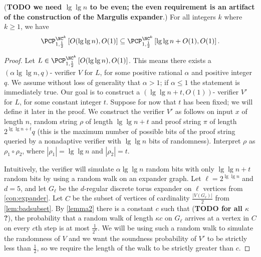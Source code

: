\documentclass[]{article}
\newcommand{\PCPcs}[5]{\PCP^{#1}_{#2, #3}\left[#4, #5\right]}
\begin{document}
\begin{lemma}[{\cite[Lemma~4]{fs96}}]\label{lem:derandomize}
  (\textbf{TODO we need $\lg \lg n$ to be even; the even requirement is an artifact of the construction of the Margulis expander}.)
  For all integers $k$ where $k \geq 1$, we have
  \begin{equation*}
    \PCPcs{\NC^k}{1}{\frac{1}{2}}{O(\lg \lg n)}{O(1)}
    \subseteq
    \PCPcs{\NC^k}{1}{\frac{1}{2}}{\lg \lg n + O(1)}{O(1)}.
  \end{equation*}
\end{lemma}
\begin{proof}
  Let $L \in \PCPcs{\NC^k}{1}{\frac{1}{2}}{O(\lg \lg n)}{O(1)}$.
  This means there exists a $(\alpha \lg \lg n, q)$-\PCP{} verifier $V$ for $L$, for some positive rational $\alpha$ and positive integer $q$.
  We assume without loss of generality that $\alpha > 1$; if $\alpha \leq 1$ the statement is immediately true.
  Our goal is to construct a $(\lg \lg n + t, O(1))$-\PCP{} verifier $V'$ for $L$, for some constant integer $t$.
  Suppose for now that $t$ has been fixed; we will define it later in the proof.
  We construct the verifier $V'$ as follows on input $x$ of length $n$, random string $\rho$ of length $\lg \lg n + t$ and proof string $\pi$ of length $2^{\lg \lg n + t} q$ (this is the maximum number of possible bits of the proof string queried by a nonadaptive verifier with $\lg \lg n$ bits of randomness).
  Interpret $\rho$ as $\rho_1 \circ \rho_2$, where $|\rho_1| = \lg \lg n$ and $|\rho_2| = t$.

  Intuitively, the verifier will simulate $\alpha \lg \lg n$ random bits with only $\lg \lg n + t$ random bits by using a random walk on an expander graph.
  Let $\ell = 2^{\lg \lg n}$ and $d = 5$, and let $G_\ell$ be the $d$-regular discrete torus expander on $\ell$ vertices from \autoref{con:expander}.
  Let $C$ be the subset of vertices of cardinality $\frac{|V(G_\ell)|}{2}$ from \autoref{lem:badsubset}.
  By \autoref{lemma2} there is a constant $c$ such that (\textbf{TODO for all $\kappa$?}), the probability that a random walk of length $\kappa c$ on $G_\ell$ arrives at a vertex in $C$ on every $c$th step is at most $\frac{1}{2^\kappa}$.
  We will be using such a random walk to simulate the randomness of $V$ and we want the soundness probability of $V'$ to be strictly less than $\frac{1}{2}$, so we require the length of the walk to be strictly greater than $c$.


\end{proof}
\end{document}
